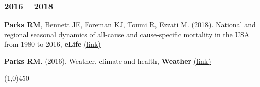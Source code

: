 \subsubsection*{2016 -- 2018}

\noindent \textbf{Parks RM}, Bennett JE, Foreman KJ, Toumi R, Ezzati M. (2018). National and regional seasonal dynamics of all-cause and cause-specific mortality in the USA from 1980 to 2016, \textbf{eLife}  \href{https://doi.org/10.7554/eLife.35500}{(link)} \medskip



\noindent \textbf{Parks RM}. (2016). Weather, climate and health, \textbf{Weather} \href{https://doi.org/10.1002/wea.2752}{(link)}




\begin{center} \line(1,0){450} \end{center}